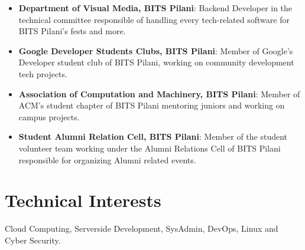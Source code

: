\documentclass[a4paper,10pt]{extarticle} %
\begin{document}
\begin{itemize}[leftmargin=0.55cm, rightmargin=0.2cm, label={\Large\textbullet}]
\vspace{0.2cm}
\item \textbf{Department of Visual Media, BITS Pilani}: Backend Developer in the technical committee responsible of handling every tech-related software for BITS Pilani's fests and more. 

\item \textbf{Google Developer Students Clubs, BITS Pilani}: Member of Google's Developer student club of BITS Pilani, working on community development tech projects.

\item\textbf{Association of Computation and Machinery, BITS Pilani}: Member of ACM's student chapter of BITS Pilani mentoring juniors and working on campus projects.

\item\textbf{Student Alumni Relation Cell, BITS Pilani}: Member of the student volunteer team working under the Alumni Relations Cell of BITS Pilani responsible for organizing Alumni related events.\\

\end{itemize}



\vspace{0.2cm}
\section{\textcolor{primary}{Technical Interests}}
\vspace{0.1cm}
\noindent Cloud Computing, Serverside Development, SysAdmin, DevOps, Linux and Cyber Security.\\


\end{document}
